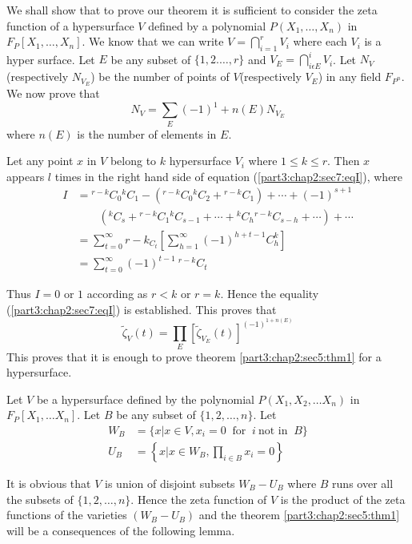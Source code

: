 We shall show that to prove our theorem it is sufficient to consider
the zeta function of a hypersurface $V$ defined by a polynomial
$P(X_1, \ldots,X_n)$ in $F_P[X_1,\ldots,X_n]$. We know that we can
write $V=\bigcap \limits ^{r}_{i=1}V_i$ where each $V_i$ is a hyper
surface. Let $E$ be any subset of $\{1,2.\ldots,r\}$ and $V_E=\bigcap
\limits_{i \epsilon E}^{i}V_i$. Let $N_V$(respectively $N_{V_E}$) be
the number of points of $V$(respectively $V_E$) in any field
$F_{P^n}$. We now prove that 
\begin{equation}
  N_V=\sum_E(-1)^1+n(E)N_{V_E} \tag{I}\label{part3:chap2:sec7:eqI}
\end{equation}
where $n(E) $ is the number of elements in $E$.

Let any point $x$ in $V$ belong to $k$ hypersurface $V_i$ where $1
\leq k \leq r$. Then $x$ appears $l$ times in the right hand side of
equation (\ref{part3:chap2:sec7:eqI}), where 
\begin{align*}
  I & ={}^{r-k}C_0 {}^kC_1-\left({}^{r-k}C_0 {}^kC_2 +{}^{r-k}C_1\right)+
  \cdots +(-1)^{s+1}\\ 
  & \qquad \left({}^k
  C_s + {}^{r-k} C_1 {}^kC_{s-1}+ \cdots+ {}^k C_h
  {}^{r-k}C_{s-h}+\cdots\right)+\cdots \\ 
  & =\sum_{t=0}^{\infty} {r-k}_{C_t} \left[ \sum^{\infty}_{h=1}
    (-1)^{h+t-1}C_h^k\right]\\ 
  & =\sum^{\infty}_{t=0}(-1)^{t-1} ~ {}^{r-k}C_t
\end{align*}\pageoriginale

Thus $I=0$ or $1$ according as $r<k$ or $r=k$. Hence the equality
(\ref{part3:chap2:sec7:eqI}) is established. This proves that 
\begin{equation}
  \tilde{\zeta}_V(t)=\prod_E [\tilde{\zeta}_{V_E}(t)]^{(-1)^{1+n(E)}}
  \tag{2}\label{part3:chap2:sec7:eq2} 
\end{equation}
This proves that it is enough to prove theorem
\ref{part3:chap2:sec5:thm1} for a hypersurface. 

Let $V$ be a hypersurface defined by the polynomial $P(X_1,X_2,\ldots
X_n)$ in $F_P[X_1,\ldots X_n]$. Let $B$ be any subset of $\{1,2,\ldots
,n\}$. 
Let
\begin{align*}
  W_B& =\{x |x\in V, x_i=0 ~\text{ for }~ i ~\text{not in }~ B \}\\
  U_B& =\left\{x|x \in W_B, \prod_{i \in B} x_i=0 \right\}
\end{align*}

It is obvious that $V$ is union of disjoint subsets $W_B-U_B$ where
$B$ runs over all the subsets of $\{1,2,\ldots,n\}$. Hence the zeta
function of $V$ is the product of the zeta functions of the varieties
$(W_B-U_B)$ and the theorem \ref{part3:chap2:sec5:thm1} will be a
consequences of the following lemma.

